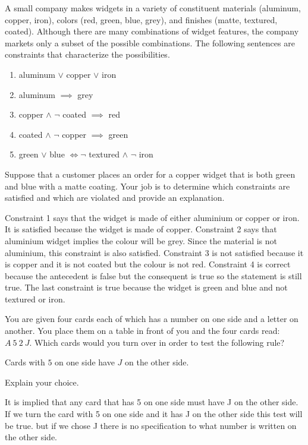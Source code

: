 \documentclass[addpoints]{exam}
\begin{document}
\begin{questions}
\question[5] A small company makes widgets in a variety of constituent materials (aluminum, copper, iron), colors (red, green, blue, grey), and finishes (matte, textured, coated). Although there are many combinations of widget features, the company markets only a subset of the possible combinations. The following sentences are constraints that characterize the possibilities. 
  \begin{enumerate}
  \item aluminum $\lor$ copper $\lor$ iron
  \item aluminum $\implies$ grey
  \item copper $\land$ $\neg$ coated $\implies$ red
  \item coated $\land$ $\neg$ copper $\implies$ green
  \item green $\lor$ blue $\iff \neg$ textured $\land$ $\neg$ iron
  \end{enumerate}
  Suppose that a customer places an order for a copper widget that is both green and blue with a matte coating. Your job is to determine which constraints are satisfied and which are violated and provide an explanation.
  \begin{solution} %
  Constraint 1 says that the widget is made of either aluminium or copper or iron. It is satisfied because the widget is made of copper. Constraint 2 says that aluminium widget implies the colour will be grey. Since the material is not aluminium, this constraint is also satisfied. Constraint 3 is not satisfied because it is copper and it is not coated but the colour is not red. Constraint 4 is correct because the antecedent is false but the consequent is true so the statement is still true. The last constraint is true because the widget is green and blue and not textured or iron.
  \end{solution}


\question[5] You are given four cards each of which has a number on one side and a letter on another. You place them on a table in front of you and the four cards read: $A\ 5\ 2\ J$. Which cards would you turn over in order to test the following rule? 
  \begin{center}
    Cards with $5$ on one side have $J$ on the other side.
  \end{center}
  Explain your choice.
  \begin{solution}
  It is implied that any card that has 5 on one side must have J on the other side. If we turn the card with 5 on one side and it has J on the other side this test will be true.
  but if we chose J there is no specification to what number is written on the other side.
  \end{solution}
  

\end{questions}
\end{document}
